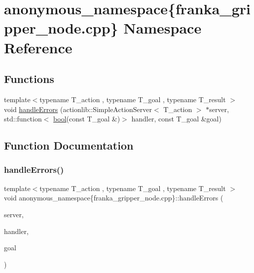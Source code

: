 \hypertarget{namespaceanonymous__namespace_02franka__gripper__node_8cpp_03}{}\section{anonymous\+\_\+namespace\{franka\+\_\+gripper\+\_\+node.\+cpp\} Namespace Reference}
\label{namespaceanonymous__namespace_02franka__gripper__node_8cpp_03}
\subsection*{Functions}
\begin{DoxyCompactItemize}
\item 
{\footnotesize template$<$typename T\+\_\+action , typename T\+\_\+goal , typename T\+\_\+result $>$ }\\void \hyperlink{namespaceanonymous__namespace_02franka__gripper__node_8cpp_03_a303e12e3dde7803ab11935d394c258c7}{handle\+Errors} (actionlib\+::\+Simple\+Action\+Server$<$ T\+\_\+action $>$ $\ast$server, std\+::function$<$ \hyperlink{classbool}{bool}(const T\+\_\+goal \&)$>$ handler, const T\+\_\+goal \&goal)
\end{DoxyCompactItemize}


\subsection{Function Documentation}
\mbox{\label{namespaceanonymous__namespace_02franka__gripper__node_8cpp_03_a303e12e3dde7803ab11935d394c258c7}} 
\subsubsection{\texorpdfstring{handle\+Errors()}{handleErrors()}}
{\footnotesize\ttfamily template$<$typename T\+\_\+action , typename T\+\_\+goal , typename T\+\_\+result $>$ \\
void anonymous\+\_\+namespace\{franka\+\_\+gripper\+\_\+node.\+cpp\}\+::handle\+Errors (\begin{DoxyParamCaption}\item[{actionlib\+::\+Simple\+Action\+Server$<$ T\+\_\+action $>$ $\ast$}]{server,  }\item[{std\+::function$<$ \hyperlink{classbool}{bool}(const T\+\_\+goal \&)$>$}]{handler,  }\item[{const T\+\_\+goal \&}]{goal }\end{DoxyParamCaption})}



